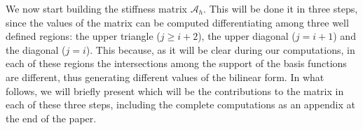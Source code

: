 We now start building the stiffness matrix $\mathcal A_h$. This will be done it in three steps, since the values of the matrix can be computed differentiating among three well defined regions: the upper triangle ($j\geq i+2$), the upper diagonal ($j=i+1$) and the diagonal ($j=i$). This because, as it will be clear during our computations, in each of these regions the intersections among the support of the basis functions are different, thus generating different values of the bilinear form. In what follows, we will briefly present which will be the contributions to the matrix in each of these three steps, including the complete computations as an appendix at the end of the paper. 
%
%

